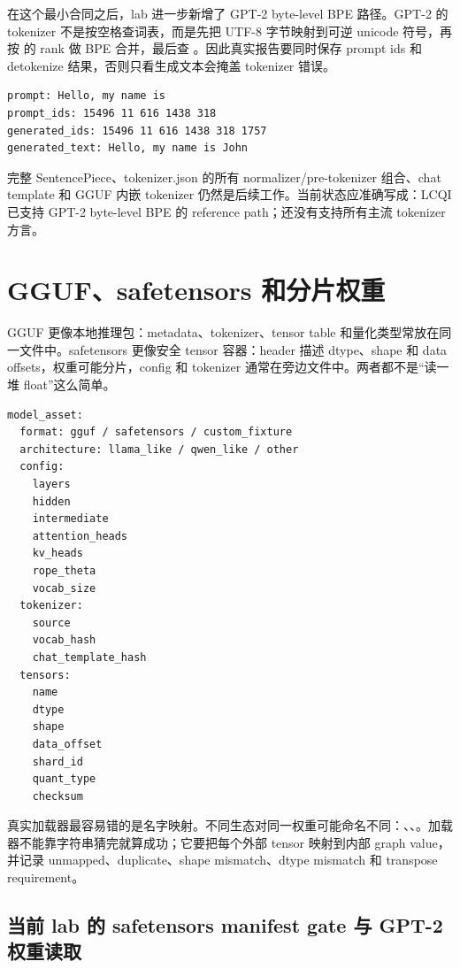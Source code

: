 在这个最小合同之后，lab 进一步新增了 GPT-2 byte-level BPE 路径。GPT-2 的 tokenizer 不是按空格查词表，而是先把 UTF-8 字节映射到可逆 unicode 符号，再按  的 rank 做 BPE 合并，最后查 。因此真实报告要同时保存 prompt ids 和 detokenize 结果，否则只看生成文本会掩盖 tokenizer 错误。

\begin{lstlisting}[numbers=none,caption={GPT-2 tokenizer smoke 的关键证据}]
prompt: Hello, my name is
prompt_ids: 15496 11 616 1438 318
generated_ids: 15496 11 616 1438 318 1757
generated_text: Hello, my name is John
\end{lstlisting}

完整 SentencePiece、tokenizer.json 的所有 normalizer/pre-tokenizer 组合、chat template 和 GGUF 内嵌 tokenizer 仍然是后续工作。当前状态应准确写成：LCQI 已支持 GPT-2 byte-level BPE 的 reference path；还没有支持所有主流 tokenizer 方言。

\section{GGUF、safetensors 和分片权重}

GGUF 更像本地推理包：metadata、tokenizer、tensor table 和量化类型常放在同一文件中。safetensors 更像安全 tensor 容器：header 描述 dtype、shape 和 data offsets，权重可能分片，config 和 tokenizer 通常在旁边文件中。两者都不是“读一堆 float”这么简单。

\begin{lstlisting}[numbers=none,caption={模型资产清单}]
model_asset:
  format: gguf / safetensors / custom_fixture
  architecture: llama_like / qwen_like / other
  config:
    layers
    hidden
    intermediate
    attention_heads
    kv_heads
    rope_theta
    vocab_size
  tokenizer:
    source
    vocab_hash
    chat_template_hash
  tensors:
    name
    dtype
    shape
    data_offset
    shard_id
    quant_type
    checksum
\end{lstlisting}

真实加载器最容易错的是名字映射。不同生态对同一权重可能命名不同：、、。加载器不能靠字符串猜完就算成功；它要把每个外部 tensor 映射到内部 graph value，并记录 unmapped、duplicate、shape mismatch、dtype mismatch 和 transpose requirement。

\subsection{当前 lab 的 safetensors manifest gate 与 GPT-2 权重读取}

